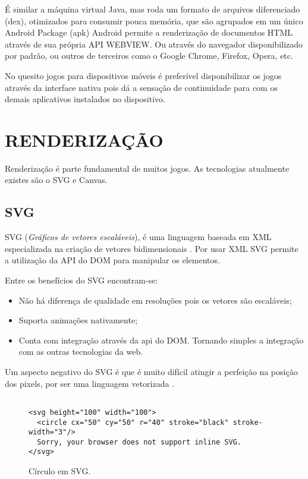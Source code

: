 É similar a máquina virtual Java, mas roda um
formato de arquivos diferenciado (dex), otimizados para consumir pouca
memória, que são agrupados em um único Android Package (apk) Android
permite a renderização de documentos HTML através de sua própria
API WEBVIEW. Ou através do navegador disponibilizado por padrão, ou
outros de terceiros como o Google Chrome, Firefox, Opera, etc.

No quesito jogos para dispositivos móveis é preferível disponibilizar
os jogos através da interface nativa pois dá a sensação de
continuidade para com os demais aplicativos instalados no dispositivo.

\section{RENDERIZAÇÃO}

Renderização é parte fundamental de muitos jogos. As tecnologias atualmente existes são o SVG e Canvas.

\subsection{SVG}
SVG (\textit{Gráficos de vetores escaláveis}), é uma linguagem
baseada em XML especializada na criação de vetores bidimensionais
\autocite{html5mostwanted}. Por usar XML SVG permite a utilização da
API do DOM para manipular os elementos.

Entre os benefícios do SVG encontram-se:

\begin{itemize}
\item Não há diferença de qualidade em resoluções pois os vetores são escaláveis;
\item Suporta animações nativamente;
\item Conta com integração através da api do DOM. Tornando simples a integração com as outras tecnologias da web.
\end{itemize}

Um aspecto negativo do SVG é que é muito difícil atingir a
perfeição na posição dos pixels, por ser uma linguagem vetorizada
\autocite{html5mostwanted}.

\begin{figure}
\centering
\begin{verbatim}

<svg height="100" width="100">
  <circle cx="50" cy="50" r="40" stroke="black" stroke-width="3"/>
  Sorry, your browser does not support inline SVG.
</svg>

\end{verbatim}
\caption{Círculo em SVG.}
\end{figure}
